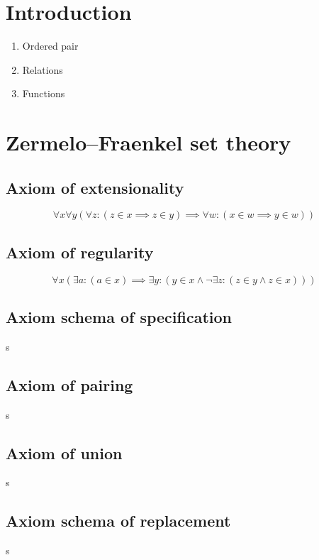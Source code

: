 \documentclass[../../main.tex]{subfiles}
\begin{document}
\section*{Introduction}
\begin{enumerate}
    \item
    Ordered pair
    \item 
    Relations
    \item
    Functions
\end{enumerate}
\section{Zermelo–Fraenkel set theory}\label{sec:fundamentals:zermelo-fraenkel_set_theory}
\subsection{Axiom of extensionality}\label{subsec:fundamentals:axiom_of_extensionality}
\begin{equation*}
    \forall x\forall y(\forall z:(z\in x\implies z\in y)\implies\forall w:(x\in w\implies y\in w))
\end{equation*}
\subsection{Axiom of regularity}\label{{subsec:fundamentals:axiom_of_regularity}}
\begin{equation*}
    \forall x(\exists a:(a\in x)\implies\exists y:(y\in x\land\lnot\exists z:(z\in y\land z\in x)))
\end{equation*}
\subsection{Axiom schema of specification}\label{subsec:fundamentals:axiom_schema_of_specification}
s
\subsection{Axiom of pairing}\label{subsec:fundamentals:axiom_of_pairing}
s
\subsection{Axiom of union}\label{subsec:fundamentals:axiom_of_union}
s 
\subsection{Axiom schema of replacement}\label{subsec:fundamentals:axiom_schema_of_replacement}
s
\end{document}
